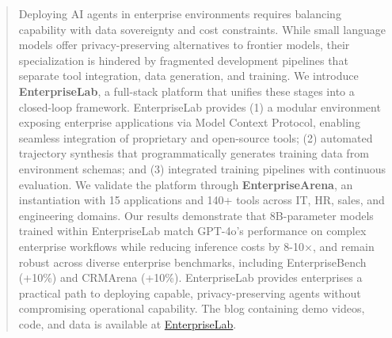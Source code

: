 \documentclass{article}
\theoremstyle{plain}
\theoremstyle{definition}
\theoremstyle{remark}
\begin{document}
\begin{abstract}
Deploying AI agents in enterprise environments requires balancing capability with data sovereignty and cost constraints. While small language models offer privacy-preserving alternatives to frontier models, their specialization is hindered by fragmented development pipelines that separate tool integration, data generation, and training. We introduce \textbf{EnterpriseLab}, a full-stack platform that unifies these stages into a closed-loop framework. EnterpriseLab provides (1) a modular environment exposing enterprise applications via Model Context Protocol, enabling seamless integration of proprietary and open-source tools; (2) automated trajectory synthesis that programmatically generates training data from environment schemas; and (3) integrated training pipelines with continuous evaluation. We validate the platform through \textbf{EnterpriseArena}, an instantiation with 15 applications and 140+ tools across IT, HR, sales, and engineering domains. Our results demonstrate that 8B-parameter models trained within EnterpriseLab match GPT-4o's performance on complex enterprise workflows while reducing inference costs by 8-10×, and remain robust across diverse enterprise benchmarks, including EnterpriseBench (+10\%) and CRMArena (+10\%). EnterpriseLab provides enterprises a practical path to deploying capable, privacy-preserving agents without compromising operational capability.
The blog containing demo videos, code, and data is available at \href{https://ast-fri.github.io/EnterpriseLab/}{EnterpriseLab}.

\end{abstract}
\vspace{-0.2cm}
\end{document}

